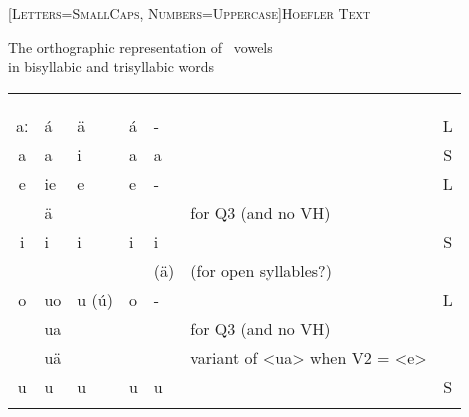 \documentclass[a4paper,12pt,landscape]{scrartcl}%
\begin{document}
\pagestyle{empty}
\renewfontfamily\scshape[Letters=SmallCaps, Numbers=Uppercase]{Hoefler Text}%

\centering
\Large

The orthographic representation of \PS\ vowels\\
{\normalsize in bisyllabic and trisyllabic words}
\bigskip
\large

\def\arraystretch{1.3}%

\begin{tabularx}{\textwidth}{ |c| Y |Y|Y|Y|l|c|}
	&	&	\\
	&		&	&	&\\[-2mm]
	&&	&		&		&&\\\dline
aː			&á		&ä			&á		&-		&		&L	\\\hline
a			&a		&i			&a		&a		&		&S	\\\dline


e			&ie		&e			&e		&-		&		&L 	\\%
			&ä		&			&		&		& for Q3 (and no VH)	&\\\hline
i			&i		&i			&i		&i		&		&S 	\\%
			&		&			&		&(ä)		& (for open syllables?)	&	\\\dline

o			&uo		&u (ú)		&o		&-		&  		&L 	\\%
			&ua		&			&		&		& for Q3 (and no VH)	&\\%
			&uä		&			&		&		& variant of <ua> when V2 = <e>	&\\\hline
u			&u		&u			&u		&u		&		& S	\\\dline


\end{tabularx}
\end{document}
